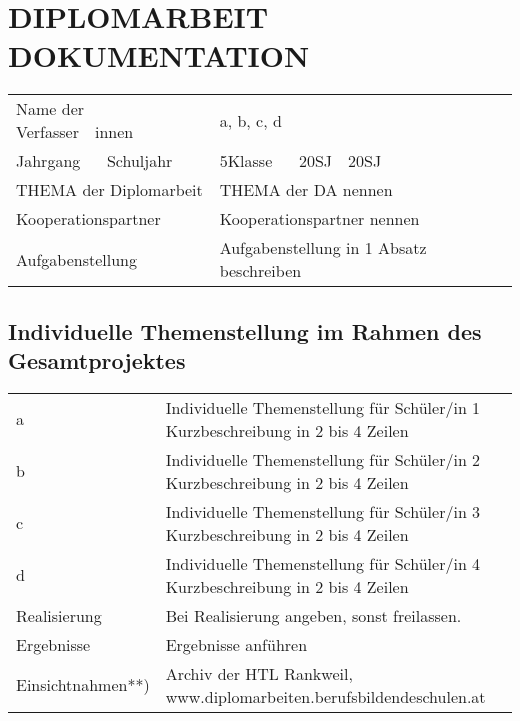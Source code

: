 \section *{DIPLOMARBEIT DOKUMENTATION}


\begin{tabular}{@{}p{5cm}p{8cm}}
	Name der Verfasser~\textbar~innen & a, b, c, d \\
	
	Jahrgang ~\textbar~ Schuljahr & 5Klasse ~\textbar~ 20SJ~\textbar~20SJ \\
	
	THEMA der Diplomarbeit & THEMA der DA nennen \\
	
	Kooperationspartner & Kooperationspartner nennen \\
	
	Aufgabenstellung & Aufgabenstellung in 1 Absatz beschreiben \\
\end{tabular}

\pagebreak

\subsection *{Individuelle Themenstellung im Rahmen des Gesamtprojektes}
\begin{tabular}{@{}p{5cm}p{8cm}}
	
	a & 	Individuelle Themenstellung für Schüler/in 1
	Kurzbeschreibung in 2 bis 4 Zeilen \\
	
	b & 	Individuelle Themenstellung für Schüler/in 2	
	Kurzbeschreibung in 2 bis 4 Zeilen \\
	
	c & 	Individuelle Themenstellung für Schüler/in 3	
	Kurzbeschreibung in 2 bis 4 Zeilen \\
	
	d & 	Individuelle Themenstellung für Schüler/in 4	
	Kurzbeschreibung in 2 bis 4 Zeilen \\
	
	Realisierung & Bei Realisierung angeben, sonst freilassen.  \\
	
	Ergebnisse & Ergebnisse anführen \\
	
	Einsichtnahmen**) & Archiv der HTL Rankweil, \newline www.diplomarbeiten.berufsbildendeschulen.at \\
\end{tabular}
